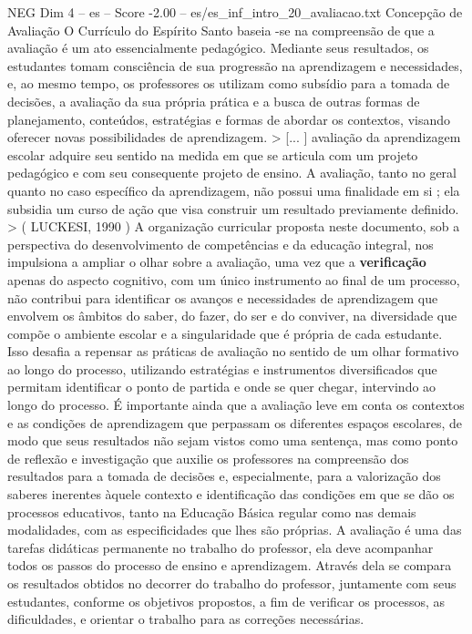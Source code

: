 \begin{textsample}{NEG Dim 4 – es – Score -2.00 – es/es\_inf\_intro\_20\_avaliacao.txt}  \label{ex:f4_neg_217}
Concepção de Avaliação O Currículo do Espírito Santo baseia -se na compreensão de que a avaliação é um ato essencialmente pedagógico.
Mediante seus resultados, os estudantes tomam consciência de sua progressão na aprendizagem e necessidades, e, ao mesmo tempo, os professores os utilizam como subsídio para a tomada de decisões, a avaliação da sua própria prática e a busca de outras formas de planejamento, conteúdos, estratégias e formas de abordar os contextos, visando oferecer novas possibilidades de aprendizagem. > [... ] avaliação da aprendizagem escolar adquire seu sentido na medida em que se articula com um projeto pedagógico e com seu consequente projeto de ensino.
A avaliação, tanto no geral quanto no caso específico da aprendizagem, não possui uma finalidade em si ; ela subsidia um curso de ação que visa construir um resultado previamente definido. > ( LUCKESI, 1990 ) A organização curricular proposta neste documento, sob a perspectiva do desenvolvimento de competências e da educação integral, nos impulsiona a ampliar o olhar sobre a avaliação, uma vez que a \textbf{verificação} apenas do aspecto cognitivo, com um único instrumento ao final de um processo, não contribui para identificar os avanços e necessidades de aprendizagem que envolvem os âmbitos do saber, do fazer, do ser e do conviver, na diversidade que compõe o ambiente escolar e a singularidade que é própria de cada estudante.
Isso desafia a repensar as práticas de avaliação no sentido de um olhar formativo ao longo do processo, utilizando estratégias e instrumentos diversificados que permitam identificar o ponto de partida e onde se quer chegar, intervindo ao longo do processo.
É importante ainda que a avaliação leve em conta os contextos e as condições de aprendizagem que perpassam os diferentes espaços escolares, de modo que seus resultados não sejam vistos como uma sentença, mas como ponto de reflexão e investigação que auxilie os professores na compreensão dos resultados para a tomada de decisões e, especialmente, para a valorização dos saberes inerentes àquele contexto e identificação das condições em que se dão os processos educativos, tanto na Educação Básica regular como nas demais modalidades, com as especificidades que lhes são próprias.
A avaliação é uma das tarefas didáticas permanente no trabalho do professor, ela deve acompanhar todos os passos do processo de ensino e aprendizagem.
Através dela se compara os resultados obtidos no decorrer do trabalho do professor, juntamente com seus estudantes, conforme os objetivos propostos, a fim de verificar os processos, as dificuldades, e orientar o trabalho para as correções necessárias.

\end{textsample}
